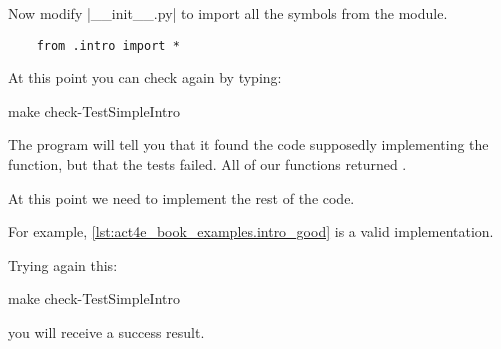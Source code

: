 Now modify \files|__init__.py| to import all the symbols from the  module.

\begin{verbatim}
    from .intro import *
\end{verbatim}

At this point you can check again by typing:

\begin{console}
    make check-TestSimpleIntro
\end{console}

The program will tell you that it found the code supposedly implementing the function, but that the tests failed.
All of our functions returned .

At this point we need to implement the rest of the code.

For example, \cref{lst:act4e_book_examples.intro_good} is a valid implementation.

\begin{longcode}
    \caption{}
    \label{lst:act4e_book_examples.intro_good}
\end{longcode}

Trying again this:

\begin{console}
    make check-TestSimpleIntro
\end{console}

you will receive a success result.

